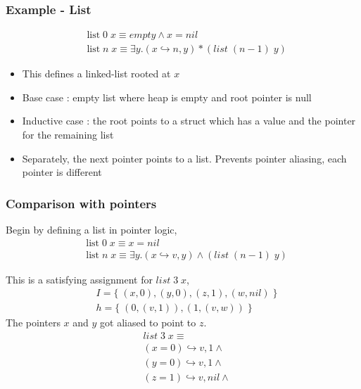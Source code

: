 \documentclass{beamer}
\begin{document}
\begin{frame}
\frametitle{Example - List}

\begin{align*}
    & \textrm{list} \; 0 \; x \equiv empty \land x = nil
    \\
    & \textrm{list} \; n \; x \equiv \exists y. (x \hookrightarrow n,y) * (list \; (n-1) \; y)
\end{align*}

\begin{itemize}
    \item This defines a linked-list rooted at $x$
    \item Base case : empty list where heap is empty and root pointer is null
    \item Inductive case : the root points to a struct which has a value and the pointer for the remaining list
    \item Separately, the next pointer points to a list. Prevents pointer aliasing, each pointer is different
\end{itemize}
\end{frame}

\begin{frame}
\frametitle{Comparison with pointers}
Begin by defining a list in pointer logic,
\begin{align*}
    & \textrm{list} \; 0 \; x \equiv x = nil
    \\
    & \textrm{list} \; n \; x \equiv \exists y. (x \hookrightarrow v,y) \land (list \; (n-1) \; y)
\end{align*}

This is a satisfying assignment for $list \; 3 \; x$,
\begin{align*}
    & I = 
    \{\; (x,0), (y,0), (z,1) , (w,nil) \;\}
    \\
    & h = 
    \{\; (0, (v,1)) , (1, (v,w)) \;\}
\end{align*}
The pointers $x$ and $y$ got aliased to point to $z$.
\begin{align*}
    & list \; 3 \; x \equiv \\
    & (x = 0) \hookrightarrow v,1 \land \\
    & (y = 0) \hookrightarrow v,1 \land \\
    & (z = 1) \hookrightarrow v,nil \land \\
\end{align*}
\end{frame}
\end{document}
